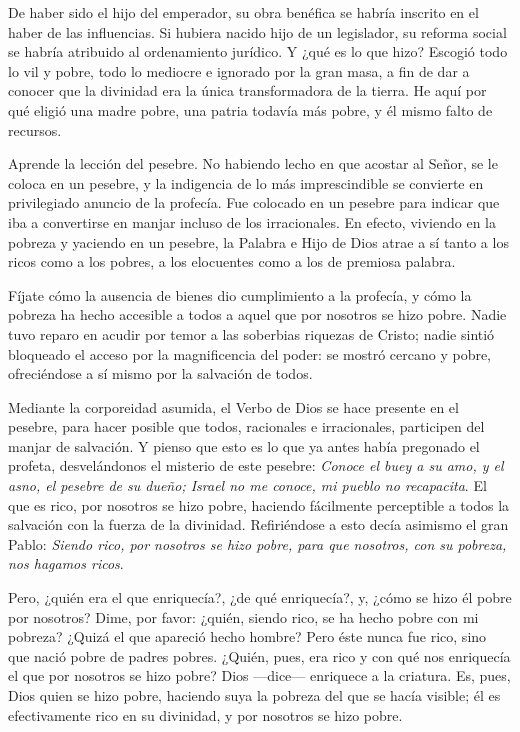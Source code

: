 De haber sido el hijo del emperador, su obra benéfica se habría inscrito en el haber de las influencias. Si hubiera nacido hijo de un legislador, su reforma social se habría atribuido al ordenamiento jurídico. Y ¿qué es lo que hizo? Escogió todo lo vil y pobre, todo lo mediocre e ignorado por la gran masa, a fin de dar a conocer que la divinidad era la única transformadora de la tierra. He aquí por qué eligió una madre pobre, una patria todavía más pobre, y él mismo falto de recursos.

Aprende la lección del pesebre. No habiendo lecho en que acostar al Señor, se le coloca en un pesebre, y la indigencia de lo más imprescindible se convierte en privilegiado anuncio de la profecía. Fue colocado en un pesebre para indicar que iba a convertirse en manjar incluso de los irracionales. En efecto, viviendo en la pobreza y yaciendo en un pesebre, la Palabra e Hijo de Dios atrae a sí tanto a los ricos como a los pobres, a los elocuentes como a los de premiosa palabra.

Fíjate cómo la ausencia de bienes dio cumplimiento a la profecía, y cómo la pobreza ha hecho accesible a todos a aquel que por nosotros se hizo pobre. Nadie tuvo reparo en acudir por temor a las soberbias riquezas de Cristo; nadie sintió bloqueado el acceso por la magnificencia del poder: se mostró cercano y pobre, ofreciéndose a sí mismo por la salvación de todos.

Mediante la corporeidad asumida, el Verbo de Dios se hace presente en el pesebre, para hacer posible que todos, racionales e irracionales, participen del manjar de salvación. Y pienso que esto es lo que ya antes había pregonado el profeta, desvelándonos el misterio de este pesebre: \emph{Conoce el buey a su amo, y el asno, el pesebre de su dueño; Israel no me conoce, mi pueblo no recapacita}. El que es rico, por nosotros se hizo pobre, haciendo fácilmente perceptible a todos la salvación con la fuerza de la divinidad. Refiriéndose a esto decía asimismo el gran Pablo: \emph{Siendo rico, por nosotros se hizo pobre, para que nosotros, con su pobreza, nos hagamos ricos}.

Pero, ¿quién era el que enriquecía?, ¿de qué enriquecía?, y, ¿cómo se hizo él pobre por nosotros? Dime, por favor: ¿quién, siendo rico, se ha hecho pobre con mi pobreza? ¿Quizá el que apareció hecho hombre? Pero éste nunca fue rico, sino que nació pobre de padres pobres. ¿Quién, pues, era rico y con qué nos enriquecía el que por nosotros se hizo pobre? Dios ---dice--- enriquece a la criatura. Es, pues, Dios quien se hizo pobre, haciendo suya la pobreza del que se hacía visible; él es efectivamente rico en su divinidad, y por nosotros se hizo pobre.

